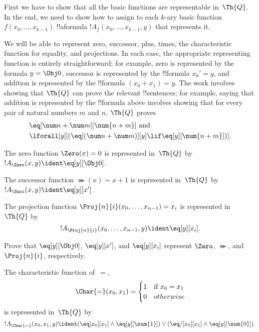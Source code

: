 \documentclass[../../../include/open-logic-section]{subfiles}
\begin{document}

First we have to show that all the basic functions are representable
in~$\Th{Q}$. In the end, we need to show how to assign to each $k$-ary
basic function $f(x_0,\dots,x_{k-1})$ !!a{formula}
$!A_f(x_0,\dots,x_{k-1},y)$ that represents it.

We will be able to represent zero, successor, plus, times, the
characteristic function for equality, and projections. In each case,
the appropriate representing function is entirely straightforward; for
example, zero is represented by the formula $y = \Obj 0$, successor is
represented by the !!{formula} $x_0' = y$, and addition is represented
by the !!{formula} $(x_0 + x_1) = y$. The work involves showing that
$\Th{Q}$ can prove the relevant !!{sentence}s; for example, saying
that addition is represented by the !!{formula} above involves showing
that for every pair of natural numbers $m$ and $n$, $\Th{Q}$ proves
\begin{align*}
& \eq[\num n + \num m][\num {n+m}] \text{ and}\\
& \lforall[y][(\eq[(\num n + \num m)][y] \lif \eq[y][\num{n+m}])].
\end{align*}

\begin{prop}
The zero function $\Zero(x) = 0$ is represented in~$\Th{Q}$ by
$!A_{\Zero}(x,y) \ident \eq[y][\Obj 0]$.
\end{prop}

\begin{prop}
The successor function $\Succ(x) = x+1$ is represented in~$\Th{Q}$ by
$!A_{\Succ}(x,y) \ident \eq[y][x']$.  
\end{prop}

\begin{prop}
The projection function $\Proj{n}{i}(x_0, \dots, x_{n-1}) = x_i$ is
represented in~$\Th{Q}$ by \[!A_{\Proj{n}{i}}(x_0, \dots, x_{n-1}, y) \ident \eq[y][x_i].\]
\end{prop}

\begin{prob}
Prove that $\eq[y][\Obj 0]$, $\eq[y][x']$, and $\eq[y][x_i]$ represent
$\Zero$, $\Succ$, and $\Proj{n}{i}$, respectively.
\end{prob}

\begin{prop}
The characteristic function of~$=$,
\[
\Char{=}(x_0, x_1) =
\begin{cases}
  1 & \text{if } x_0 =x_1\\
  0 & otherwise
\end{cases}
\]
is represented in~$\Th{Q}$ by
\[
  !A_{\Char{=}}(x_0, x_1, y) \ident (\eq[x_0][x_1] \land \eq[y][\num{1}]) \lor (\eq/[x_0][x_1] \land
\eq[y][\num{0}]).
\]
\end{prop}
\end{document}

